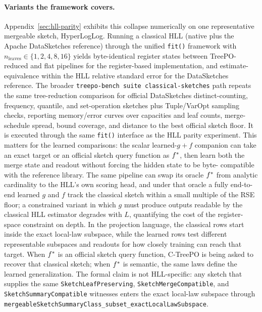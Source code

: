 \paragraph{Variants the framework covers.}
Appendix~\ref{sec:hll-parity} exhibits this collapse numerically on one
representative mergeable sketch, HyperLogLog. Running a classical HLL
(native plus the Apache DataSketches reference) through the unified
\texttt{fit()} framework with $n_{\mathrm{leaves}} \in \{1, 2, 4, 8,
16\}$ yields byte-identical register states between TreePO-reduced and
flat pipelines for the register-based implementation, and
estimate-equivalence within the HLL relative standard error for the
DataSketches reference. The broader \texttt{treepo-bench suite
classical-sketches} path repeats the same tree-reduction comparison
for official DataSketches distinct-counting, frequency, quantile, and
set-operation sketches plus Tuple/VarOpt sampling checks, reporting
memory/error curves over capacities and leaf counts, merge-schedule
spread, bound coverage, and distance to the best official sketch
floor. It is executed through the same \texttt{fit()} interface as the
HLL parity experiment. This matters for the learned comparisons: the
scalar learned-$g{+}f$ companion can take an exact target or an
official sketch query function as $f^\ast$, then learn both the merge
state and readout without forcing the hidden state to be byte-
compatible with the reference library. The same pipeline can swap its
oracle $f^\ast$ from analytic cardinality to the HLL's own scoring
head, and under that oracle a fully end-to-end learned $g$ and $f$
track the classical sketch within a small multiple of the RSE floor;
a constrained variant in which $g$ must produce outputs readable by
the classical HLL estimator degrades with $L$, quantifying the cost of
the register-space constraint on depth. In the projection language,
the classical rows start inside the exact local-law subspace, while
the learned rows test different representable subspaces and readouts
for how closely training can reach that target. When $f^\ast$ is an
official sketch query function, C-TreePO is being asked to recover
that classical sketch; when $f^\ast$ is semantic, the same laws define
the learned generalization. The formal claim is not HLL-specific: any
sketch that supplies the same \texttt{SketchLeafPreserving},
\texttt{SketchMergeCompatible}, and \texttt{SketchSummaryCompatible}
witnesses enters the exact local-law subspace through
\texttt{mergeableSketchSummaryClass\_subset\_exactLocalLawSubspace}.

